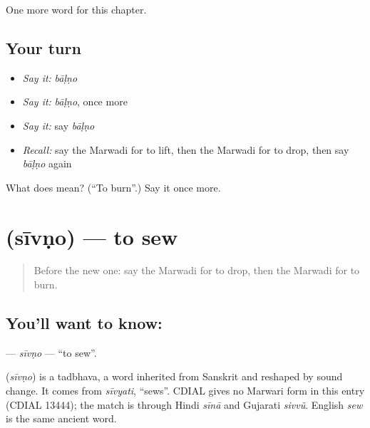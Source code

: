 \begin{grammarlens}[title={What you've built}]
One more word for this chapter.
\end{grammarlens}

\subsection*{Your turn}
\begin{itemize}
\raggedright
  \item \emph{Say it:} \emph{bāḷṇo}
  \item \emph{Say it:} \emph{bāḷṇo}, once more
  \item \emph{Say it:} say \emph{bāḷṇo}
  \item \emph{Recall:} say the Marwadi for to lift, then the Marwadi for to drop, then say \emph{bāḷṇo} again
\end{itemize}

\begin{tcolorbox}[breakable,colback=teal!4,colframe=teal!35!black,title={Before you move on}]
What does  mean? (\textquotedblleft{}To burn\textquotedblright{}.) Say it once more.
\end{tcolorbox}
\section[\texorpdfstring{\mw{सीवणो} (sīvṇo)}{सीवणो (sīvṇo)}]{ (sīvṇo) — to sew}

\label{lesson:MW-C106-sivno}



\begin{quote}
Before the new one: say the Marwadi for to drop, then the Marwadi for to burn.
\end{quote}

\subsection*{You'll want to know: }
\textbf{} — \emph{sīvṇo} — \textquotedblleft{}to sew\textquotedblright{}.

\begin{cousinweb}
\textbf{} (\emph{sīvṇo}) is a tadbhava, a word inherited from Sanskrit and reshaped by sound change. It comes from \emph{sīvyati}, \textquotedblleft{}sews\textquotedblright{}. CDIAL gives no Marwari form in this entry (CDIAL 13444); the match is through Hindi \emph{sīnā} and Gujarati \emph{sivvũ}. English \emph{sew} is the same ancient word.
\end{cousinweb}

